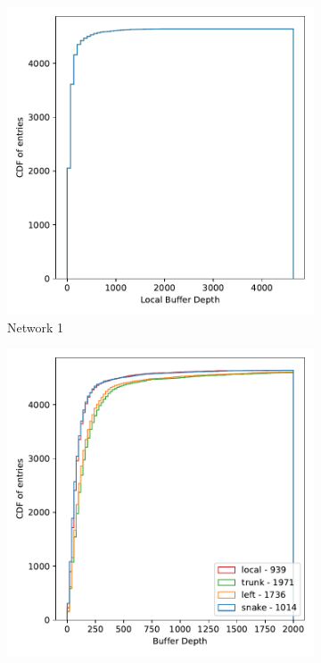 \begin{figure}
  \centering
  \begin{subfigure}[b]{0.475\textwidth}
      \centering
      \includegraphics[width=\textwidth]{./images/mp60_16_fast_local_stack.pdf}
      \caption[Network2]%
      {{\small Network 1}}    
  \end{subfigure}
  \hfill
  \begin{subfigure}[b]{0.475\textwidth}  
      \centering 
      \includegraphics[width=\textwidth]{./images/mp60_16_fast_remote_stack.pdf}

\end{subfigure}
\end{figure}
